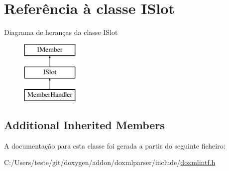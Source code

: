 \hypertarget{class_i_slot}{\section{Referência à classe I\-Slot}
\label{class_i_slot}
}
Diagrama de heranças da classe I\-Slot\begin{figure}[H]
\begin{center}
\leavevmode
\includegraphics[height=3.000000cm]{class_i_slot}
\end{center}
\end{figure}
\subsection*{Additional Inherited Members}


A documentação para esta classe foi gerada a partir do seguinte ficheiro\-:\begin{DoxyCompactItemize}
\item 
C\-:/\-Users/teste/git/doxygen/addon/doxmlparser/include/\hyperlink{include_2doxmlintf_8h}{doxmlintf.\-h}\end{DoxyCompactItemize}

